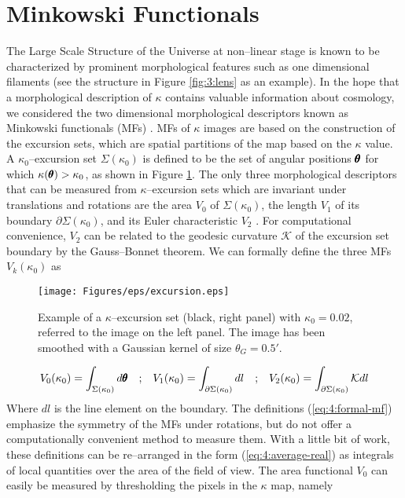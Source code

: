 \section{Minkowski Functionals}
\label{sec:4:mink}
The Large Scale Structure of the Universe at non--linear stage is known to be characterized by prominent morphological features such as one dimensional filaments (see the structure in Figure \ref{fig:3:lens} as an example). In the hope that a morphological description of $\kappa$ contains valuable information about cosmology, we considered the two dimensional morphological descriptors known as Minkowski functionals (MFs) \citep{Tomita,MatsubaraLong}. MFs of $\kappa$ images are based on the construction of the excursion sets, which are spatial partitions of the map based on the $\kappa$ value. A $\kappa_0$--excursion set $\Sigma(\kappa_0)$ is defined to be the set of angular positions $\pmb{\theta}$ for which $\kappa(\pmb{\theta})>\kappa_0$, as shown in Figure \ref{fig:4:excursion}. The only three morphological descriptors that can be measured from $\kappa$--excursion sets which are invariant under translations and rotations are the area $V_0$ of $\Sigma(\kappa_0)$, the length $V_1$ of its boundary $\partial\Sigma(\kappa_0)$, and its Euler characteristic $V_2$ \citep{MatsubaraLong}. For computational convenience, $V_2$ can be related to the geodesic curvature $\mathcal{K}$ of the excursion set boundary by the Gauss--Bonnet theorem. We can formally define the three MFs $V_k(\kappa_0)$ as 
%
\begin{figure}
\begin{center}
\texttt{[image: Figures/eps/excursion.eps]}
\end{center}
\caption{Example of a $\kappa$--excursion set (black, right panel) with $\kappa_0=0.02$, referred to the image on the left panel. The image has been smoothed with a Gaussian kernel of size $\theta_G=0.5'$.}
\label{fig:4:excursion}
\end{figure}
%
\begin{equation}
\label{eq:4:formal-mf}
\begin{matrix}
\displaystyle V_0(\kappa_0) = \int_{\Sigma(\kappa_0)} d\pmb{\theta} & ; & \displaystyle V_1(\kappa_0) = \int_{\partial\Sigma(\kappa_0)} dl & ; & \displaystyle V_2(\kappa_0) = \int_{\partial\Sigma(\kappa_0)}\mathcal{K}dl
\end{matrix}
\end{equation}   
%
Where $dl$ is the line element on the boundary. The definitions (\ref{eq:4:formal-mf}) emphasize the symmetry of the MFs under rotations, but do not offer a computationally convenient method to measure them. With a little bit of work, these definitions can be re--arranged in the form (\ref{eq:4:average-real}) as integrals of local quantities over the area of the field of view. The area functional $V_0$ can easily be measured by thresholding the pixels in the $\kappa$ map, namely

